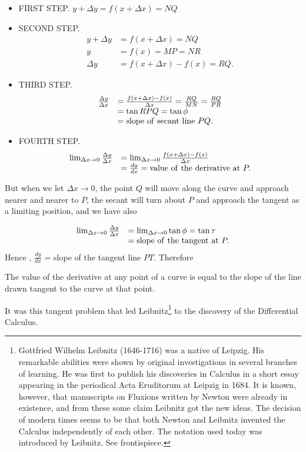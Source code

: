 \begin{itemize}
\item
FIRST STEP. $	y + \Delta y 	= f(x + \Delta x) 	= NQ$

\item
SECOND STEP. 
\[
\begin{array}{ll}
y + \Delta y &	= f(x + \Delta x) 	= NQ\\
  	y &	= f(x) 	= MP = NR\\
  	\Delta y &=	f(x + \Delta x) − f(x) 	= RQ.
\end{array}
\]

\item
THIRD STEP. 
\[
\begin{array}{ll}
\frac{\Delta y}{\Delta x} &	= \frac{f(x + \Delta x) - f(x)}{\Delta x} = \frac{RQ}{MN} = \frac{RQ}{PR}\\
&  	= \tan RPQ = \tan \phi \\
&  	= {\rm slope\ of\ secant\ line\ } PQ.
\end{array}
\]

\item
FOURTH STEP. 
\[
\begin{array}{ll}
	\lim_{\Delta x \to 0} \frac{\Delta y}{\Delta x} 
&= \lim_{\Delta x \to 0} \frac{f(x + \Delta x) - f(x)}{\Delta x}\\
& 	= \frac{dy}{dx} = {\rm value\ of\ the\ derivative\ at\ } P.
\end{array}
\]
\end{itemize}

But when we let $\Delta x \to 0$, the point $Q$ will move along the curve 
and approach nearer and nearer to $P$, the secant will turn about $P$ and 
approach the tangent as a limiting position, and we have also

\[
\begin{array}{ll}
  	\lim_{\Delta x \to 0} \frac{\Delta y}{\Delta x} &= \lim_{\Delta x \to 0} \tan \phi = \tan \tau\\
&  	= {\rm slope\ of\ the\ tangent\ at\ } P.
\end{array}
\]
Hence %
, $\frac{dy}{dx}$ = slope of the tangent line $PT$. Therefore

\begin{theorem}
The value of the derivative at any point of a curve is equal to the 
slope of the line drawn tangent to the curve at that point.
\end{theorem}

It was this tangent problem that led Leibnitz\footnote{Gottfried Wilhelm 
Leibnitz (1646-1716) was a native of Leipzig. 
His remarkable abilities were shown by original investigations 
in several branches of learning. 
He was first to publish his discoveries in Calculus in 
a short essay appearing in the periodical Acta Eruditorum at 
Leipzig in 1684. It is known, 
however, that manuscripts on Fluxions written by Newton were already 
in existence, and 
from these some claim Leibnitz got the new ideas. The decision of 
modern times seems 
to be that both Newton and Leibnitz invented the Calculus independently 
of each other. 
The notation used today was introduced by Leibnitz. See frontispiece.} 
to the discovery of the Differential Calculus.

